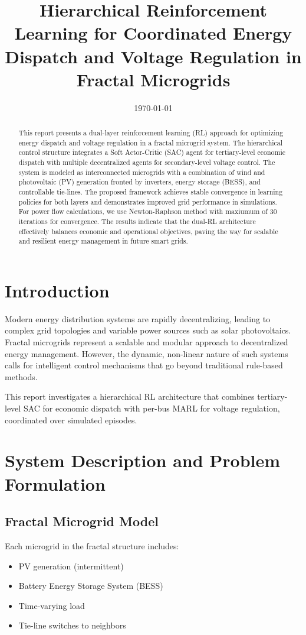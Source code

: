 \documentclass[11pt]{article}
\title{Hierarchical Reinforcement Learning for Coordinated Energy Dispatch and Voltage Regulation in Fractal Microgrids}
\date{\today}
\begin{document}
\maketitle

\begin{abstract}
This report presents a dual-layer reinforcement learning (RL) approach for optimizing energy dispatch and voltage regulation in a fractal microgrid system. The hierarchical control structure integrates a Soft Actor-Critic (SAC) agent for tertiary-level economic dispatch with multiple decentralized agents for secondary-level voltage control. The system is modeled as interconnected microgrids with 
a combination of wind and photovoltaic (PV) generation fronted by inverters, energy storage (BESS), and controllable tie-lines. The proposed framework achieves stable convergence in learning policies for both layers and demonstrates improved grid performance in simulations. For power flow calculations, we use Newton-Raphson method with maxiumum of 30 iterations for convergence. The results indicate that the dual-RL architecture effectively balances economic and operational objectives, paving the way for scalable and resilient energy management in future smart grids.
\end{abstract}

\section{Introduction}
Modern energy distribution systems are rapidly decentralizing, leading to complex grid topologies and variable power sources such as solar photovoltaics. Fractal microgrids represent a scalable and modular approach to decentralized energy management. However, the dynamic, non-linear nature of such systems calls for intelligent control mechanisms that go beyond traditional rule-based methods.

This report investigates a hierarchical RL architecture that combines tertiary-level SAC for economic dispatch with per-bus MARL for voltage regulation, coordinated over simulated episodes.

\section{System Description and Problem Formulation}

\subsection{Fractal Microgrid Model}
Each microgrid in the fractal structure includes:
\begin{itemize}
  \item PV generation (intermittent)
  \item Battery Energy Storage System (BESS)
  \item Time-varying load
  \item Tie-line switches to neighbors
\end{itemize}
\end{document}
